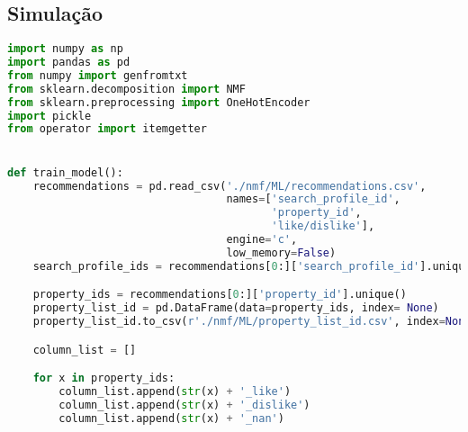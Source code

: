 \begin{apendicesenv}

\partapendices \chapter{Simulação}




\lstset{style=mystyle}

\begin{lstlisting}[language=Python, caption=API - NMF Machine Learning Code]
import numpy as np
import pandas as pd
from numpy import genfromtxt
from sklearn.decomposition import NMF
from sklearn.preprocessing import OneHotEncoder
import pickle
from operator import itemgetter


def train_model():
    recommendations = pd.read_csv('./nmf/ML/recommendations.csv',
                                  names=['search_profile_id',
                                         'property_id',
                                         'like/dislike'],
                                  engine='c',
                                  low_memory=False)
    search_profile_ids = recommendations[0:]['search_profile_id'].unique()

    property_ids = recommendations[0:]['property_id'].unique()
    property_list_id = pd.DataFrame(data=property_ids, index= None)
    property_list_id.to_csv(r'./nmf/ML/property_list_id.csv', index=None, header=True)

    column_list = []

    for x in property_ids:
        column_list.append(str(x) + '_like')
        column_list.append(str(x) + '_dislike')
        column_list.append(str(x) + '_nan')


\end{lstlisting}
\end{apendicesenv}
